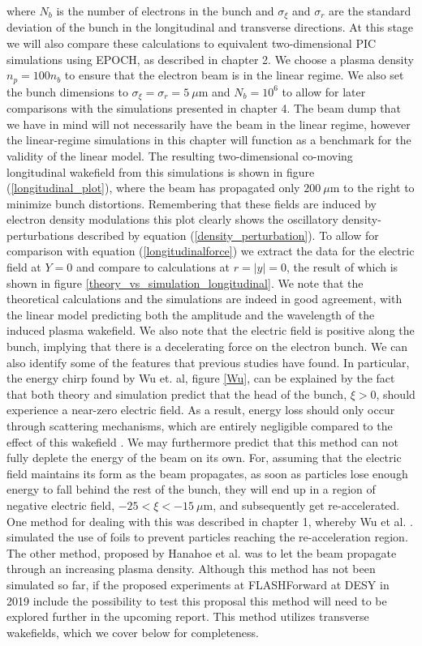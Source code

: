 \noindent where $N_b$ is the number of electrons in the bunch and $\sigma_{\xi}$ and $\sigma_r$ are the standard deviation of the bunch in the longitudinal and transverse directions. At this stage we will also compare these calculations to equivalent two-dimensional PIC simulations using EPOCH, as described in chapter 2.  We choose a plasma density $n_p=100n_b$ to ensure that the electron beam is in the linear regime. We also set the bunch dimensions to $\sigma_{\xi}=\sigma_r=5~\mu\text{m}$ and $N_b=10^6$ to allow for later comparisons with the simulations presented in chapter 4. The beam dump that we have in mind will not necessarily have the beam in the linear regime, however the linear-regime simulations in this chapter will function as a benchmark for the validity of the linear model. The resulting two-dimensional co-moving longitudinal wakefield from this simulations is shown in figure (\ref{longitudinal_plot}), where the beam has propagated only $200~\mu\text{m}$ to the right to minimize bunch distortions. Remembering that these fields are induced by electron density modulations this plot clearly shows the oscillatory density-perturbations described by equation (\ref{density_perturbation}). To allow for comparison with equation (\ref{longitudinalforce}) we extract the data for the electric field at $Y=0$ and compare to calculations at $r=|y|=0$, the result of which is shown in figure \ref{theory_vs_simulation_longitudinal}. We note that the theoretical calculations and the simulations are indeed in good agreement, with the linear model predicting both the amplitude and the wavelength of the induced plasma wakefield. We also note that the electric field is positive along the bunch, implying that there is a decelerating force on the electron bunch. We can also identify some of the features that previous studies have found. In particular, the energy chirp found by Wu et. al, figure \ref{Wu}, can be explained by the fact that both theory and simulation predict that the head of the bunch, $\xi>0$, should experience a near-zero electric field. As a result, energy loss should only occur through scattering mechanisms, which are entirely negligible compared to the effect of this wakefield \cite{Wu2010}. We may furthermore predict that this method can not fully deplete the energy of the beam on its own. For, assuming that the electric field maintains its form as the beam propagates, as soon as particles lose enough energy to fall behind the rest of the bunch, they will end up in a region of negative electric field, $-25<\xi<-15 ~\mu\text{m}$, and subsequently get re-accelerated. One method for dealing with this was described in chapter 1, whereby Wu et al. \cite{Wu2010}. simulated the use of foils to prevent particles reaching the re-acceleration region. The other method, proposed by Hanahoe et al. \cite{Hanahoe2017} was to let the beam propagate through an increasing plasma density. Although this method has not been simulated so far, if the proposed experiments at FLASHForward at DESY in 2019 include the possibility to test this proposal this method will need to be explored further in the upcoming report. This method utilizes transverse wakefields, which we cover below for completeness. 

